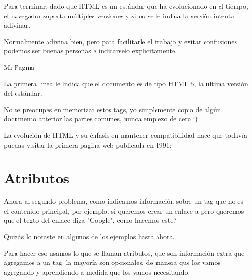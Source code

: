 \documentclass[letterpaper,10pt,spanish]{sphinxmanual}
\begin{document}
Para terminar, dado que HTML es un estándar que ha evolucionado en el tiempo,
el navegador soporta múltiples versiones y si no se le indica la versión intenta
adivinar.

Normalmente adivina bien, pero para facilitarle el trabajo y evitar confusiones
podemos ser buenas personas e indicarselo explícitamente.

%
\begin{sphinxVerbatim}[commandchars=\\\{\}]
         
        Mi Pagina

\end{sphinxVerbatim}

La primera linea le indica que el documento es de tipo HTML 5, la ultima versión
del estándar.

No te preocupes en memorizar estos tags, yo simplemente copio de algún documento
anterior las partes comunes, nunca empiezo de cero :)

La evolución de HTML y su énfasis en mantener compatibilidad hace que todavía
puedas visitar la primera pagina web publicada en 1991: 


\section{Atributos}
\label{\detokenize{html-atributos-y-metadatos:atributos}}
Ahora al segundo problema, como indicamos información sobre un tag que no es
el contenido principal, por ejemplo, si queremos crear un enlace a  pero queremos que el texto del enlace diga "Google", como hacemos esto?

Quizás lo notaste en algunos de los ejemplos hasta ahora.

Para hacer eso usamos lo que se llaman atributos, que son información extra que
agregamos a un tag, la mayoría son opcionales, de manera que los vamos agregando
y aprendiendo a medida que los vamos necesitando.
\end{document}
